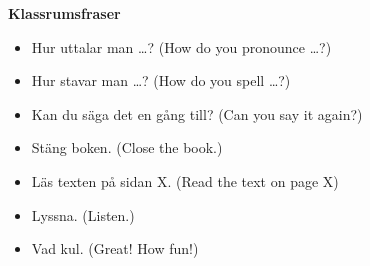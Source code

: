 
\begin{flushleft}
    \textbf{Klassrumsfraser}
    \begin{itemize}
        \item Hur uttalar man \ldots? (How do you pronounce \ldots?)
        \item Hur stavar man \ldots? (How do you spell \ldots?)
        \item Kan du säga det en gång till? (Can you say it again?)
        \item Stäng boken. (Close the book.)
        \item Läs texten på sidan X. (Read the text on page X)
        \item Lyssna. (Listen.)
        \item Vad kul. (Great! How fun!)
    \end{itemize}
\end{flushleft}

